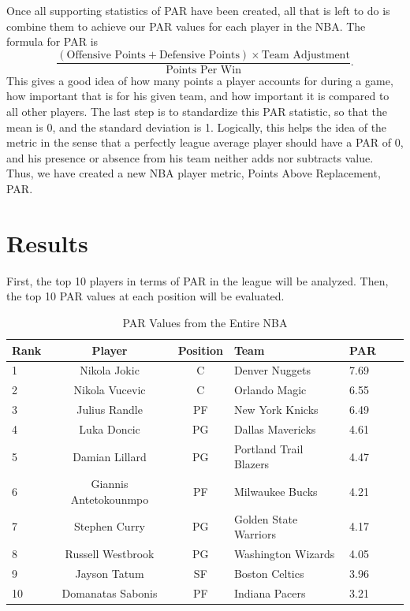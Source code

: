 \documentclass[12pt, titlepage]{article}
\begin{document}
Once all supporting statistics of PAR have been created, all that is left to do is combine them to achieve our PAR values for each player in the NBA. The formula for PAR is
\begin{equation}
  \label{eq:par}
  \frac{(\text{Offensive Points} + \text{Defensive Points}) \times \text{Team Adjustment}}
  {\text{Points Per Win}}.
\end{equation}
This gives a good idea of how many points a player accounts for during a game, how important that is for 
his given team, and how important it is compared to all other players. The last step is to standardize this 
PAR statistic, so that the mean is 0, and the standard deviation is 1. Logically, this helps the idea of the 
metric in the sense that a perfectly league average player should have a PAR of 0, and his presence or 
absence from his team neither adds nor subtracts value. Thus, we have created a new NBA player metric, 
Points Above Replacement, PAR.

 
\section{Results}
First, the top 10 players in terms of PAR in the league will be analyzed. Then, the top 10 PAR values at each position will be evaluated.

\begin{table}[H]
  \caption{PAR Values from the Entire NBA}
  \label{tab:NBAtable}
\centering
\begin{tabular}[t]{lccllll}
  \toprule
  Rank & Player & Position & Team & PAR\\
  \midrule
 1 & Nikola Jokic & C & Denver Nuggets & 7.69\\
  \midrule
 2 & Nikola Vucevic & C & Orlando Magic & 6.55\\
  \midrule
 3 & Julius Randle & PF & New York Knicks & 6.49\\
  \midrule
 4 & Luka Doncic & PG & Dallas Mavericks & 4.61\\
  \midrule
 5 & Damian Lillard & PG & Portland Trail Blazers & 4.47\\
  \midrule
 6 & Giannis Antetokounmpo & PF & Milwaukee Bucks & 4.21\\
  \midrule
 7 & Stephen Curry & PG & Golden State Warriors & 4.17\\
  \midrule
 8 & Russell Westbrook & PG & Washington Wizards & 4.05\\
  \midrule
 9 & Jayson Tatum & SF & Boston Celtics & 3.96\\
  \midrule
 10 & Domanatas Sabonis & PF & Indiana Pacers & 3.21\\
  \bottomrule
\end{tabular}
\end{table}
\end{document}
